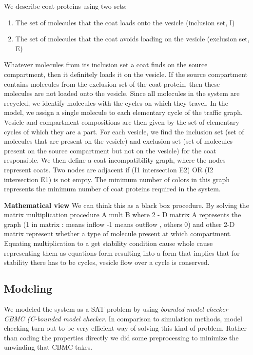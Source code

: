 \documentclass[preprint,12pt]{elsarticle}
\begin{document}
We describe coat proteins using two sets:
\begin{enumerate}
\item The set of molecules that the coat loads onto the vesicle (inclusion set, I)
\item The set of molecules that the coat avoids loading on the vesicle (exclusion set, E) 
\end{enumerate}

Whatever molecules from its inclusion set a coat finds on the source compartment, then it definitely loads it on the vesicle. If the source compartment contains molecules from the exclusion set of the
coat protein, then these molecules are not loaded onto the vesicle.
Since all molecules in the system are recycled, we identify molecules with the cycles on which they travel. In the model, we assign a single molecule to each elementary cycle of the traffic graph. Vesicle and compartment compositions are then given by the set of elementary cycles of which they are a part.
For each vesicle, we find the inclusion set (set of molecules that are present on the vesicle) and exclusion set (set of molecules present on the source compartment but not on the vesicle) for the
coat responsible.
We then define a coat incompatibility graph, where the nodes represent coats. Two nodes are adjacent if (I1 intersection E2) OR (I2 intersection E1) is not empty. The minimum number of colors in this graph represents the minimum number of coat proteins required in the system.

\textbf{Mathematical view} We can think this as a black box procedure. By solving the matrix multiplication procedure A mult B  where 2 - D matrix A represents the graph (1 in matrix : means  inflow -1 means outflow , others 0) and other 2-D matrix represent whether a type of molecule present at which compartment. Equating multiplication to a get stability condition cause whole cause representing them as equations form resulting into a form that implies that for stability there has to be cycles, vesicle flow over a cycle is conserved. 

\subsection{Modeling}
We modeled the system as a SAT problem by using \textit{bounded model checker CBMC (C-bounded model checker}. In comparison to simulation methods, model checking turn out to be very efficient way of solving this kind of problem. Rather than coding the properties directly we did some preprocessing to minimize the unwinding that CBMC takes. 
\end{document}
